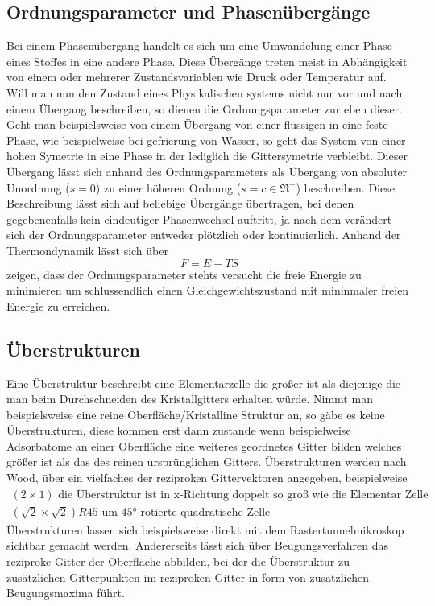     \subsection{Ordnungsparameter und Phasenübergänge}
       Bei einem Phasenübergang handelt es sich um eine Umwandelung einer Phase eines Stoffes in 
       eine andere Phase. Diese Übergänge treten meist in Abhängigkeit von einem oder mehrerer Zustandsvariablen
       wie Druck oder Temperatur auf.\\
       Will man nun den Zustand eines Physikalischen systems nicht nur vor und nach einem Übergang beschreiben,
       so dienen die Ordnungsparameter zur eben dieser. Geht man beispielsweise von einem Übergang von einer
       flüssigen in eine feste Phase, wie beispielweise bei gefrierung von Wasser, so geht das System von einer
       hohen Symetrie in eine Phase in der lediglich die Gittersymetrie verbleibt. Dieser Übergang lässt sich
       anhand des Ordnungsparameters als Übergang von absoluter Unordnung ($s=0$) zu einer höheren Ordnung
       ($s=c\in \Re^+$) beschreiben. Diese Beschreibung lässt sich auf beliebige Übergänge übertragen, bei denen
       gegebenenfalls kein eindeutiger Phasenwechsel auftritt, ja nach dem verändert sich der Ordnungsparameter
       entweder plötzlich oder kontinuierlich. Anhand der Thermondynamik lässt sich über
       \begin{equation}
           F = E-TS
       \end{equation}
       zeigen, dass der Ordnungsparameter stehts versucht die freie Energie zu minimieren um schlussendlich
       einen Gleichgewichtszustand mit mininmaler freien Energie zu erreichen. 

    \subsection{Überstrukturen}
        Eine Überstruktur beschreibt eine Elementarzelle die größer ist als diejenige die man beim Durchschneiden
        des Kristallgitters erhalten würde. Nimmt man beispielsweise eine reine Oberfläche/Kristalline Struktur an, so
        gäbe es keine Überstrukturen, diese kommen erst dann zustande wenn beispielweise Adsorbatome an einer Oberfläche
        eine weiteres geordnetes Gitter bilden welches größer ist als das des reinen ursprünglichen Gitters.
        Überstrukturen werden nach Wood, über ein vielfaches der reziproken Gittervektoren angegeben, beispielweise
        \begin{align*}
            (2\times1) \text{  die Überstruktur ist in x-Richtung doppelt so groß wie die Elementar Zelle}\\
            (\sqrt{2}\times\sqrt{2})R45 \text{  um 45° rotierte quadratische Zelle}
        \end{align*}
        Überstrukturen lassen sich beispielsweise direkt mit dem Rastertunnelmikroskop sichtbar gemacht werden.
        Andererseits lässt sich über Beugungsverfahren das reziproke Gitter der Oberfläche abbilden, bei der die
        Überstruktur zu zusätzlichen Gitterpunkten im reziproken Gitter in form von zusätzlichen Beugungsmaxima
        führt. 

